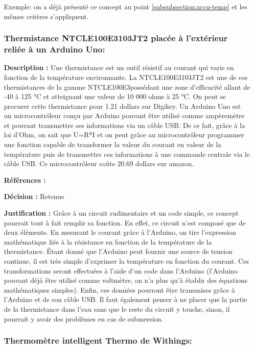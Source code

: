 Exemple: on a déjà présenté ce concept au point \ref{subsubsection:accu-temp} et les mêmes critères s'appliquent.

\subsubsection{Thermistance NTCLE100E3103JT2 placée à l’extérieur reliée à un Arduino Uno:}
\label{thermis}

\textbf{Description :} Une thermistance est un outil résistif au courant qui varie en fonction de la température environnante. La NTCLE100E3103JT2 est une de ces thermistances de la gamme NTCLE100E3possédant une zone d’efficacité allant de -40 à 125 °C et atteignant une valeur de 10 000 ohms à 25 °C. On peut se procurer cette thermistance pour 1.21 dollars sur Digikey. Un Arduino Uno est un microcontrôleur conçu par Arduino pouvant être utilisé comme ampèremètre et pouvant transmettre ses informations via un câble USB. De ce fait, grâce à la loi d’Ohm, on sait que U=R*I et on peut grâce au microcontrôleur programmer une fonction capable de transformer la valeur du courant en valeur de la température puis de transmettre ces informations à une commande centrale via le câble USB. Ce microcontrôleur coûte 20.69 dollars sur amazon. 

\textbf{Références :} \cite{TuAr} \cite{DaTh} \cite{AmAr}

\textbf{Décision :} Retenue

\textbf{Justification :} Grâce à un circuit rudimentaire et un code simple, ce concept pourrait tout à fait remplir sa fonction. En effet, ce circuit n’est composé que de deux éléments. En mesurant le courant grâce à l’Arduino, on tire l’expression mathématique liée à la résistance en fonction de la température de la thermistance. Étant donné que l’Arduino peut fournir une source de tension continue, il est très simple d’exprimer la température en fonction du courant. Ces transformations seront effectuées à l’aide d’un code dans l’Arduino (l’Arduino pouvant déjà être utilisé comme voltmètre, on n’a plus qu’à établir des équations mathématiques simples). Enfin, ces données pourront être transmises grâce à l’Arduino et de son câble USB. Il faut également penser à ne placer que la partie de la thermistance dans l'eau sans que le reste du circuit y touche, sinon, il pourrait y avoir des problèmes en cas de submersion.

\subsubsection{Thermomètre intelligent Thermo de Withings:}

